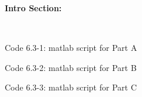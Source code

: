 

\begin{LARGE}
  \textbf{Intro Section:}\\
\end{LARGE}\\





\begin{homeworkProblem}

\newline
\begin{center}
{Code 6.3-1: matlab script for Part A}
\end{center}



\pagebreak

\end{homeworkProblem}


\begin{homeworkProblem}

\begin{center}
{Code 6.3-2: matlab script for Part B}
\end{center}


\end{homeworkProblem}


\begin{homeworkProblem}


\begin{center}
{Code 6.3-3: matlab script for Part C}
\end{center}


\end{homeworkProblem}

